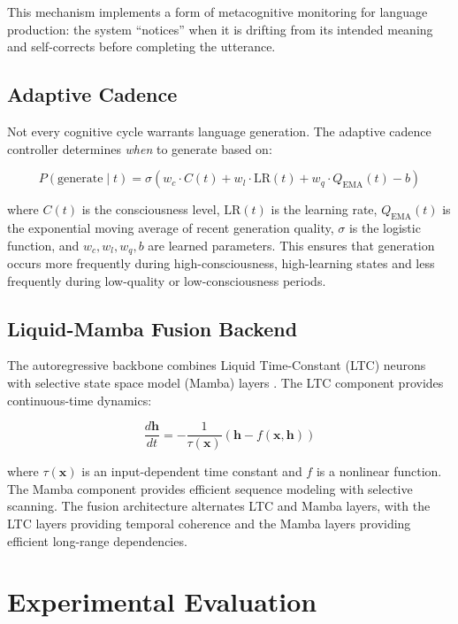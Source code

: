 \documentclass[12pt,a4paper]{article}
\begin{document}
This mechanism implements a form of metacognitive monitoring for language production: the system ``notices'' when it is drifting from its intended meaning and self-corrects before completing the utterance.

\subsection{Adaptive Cadence}

Not every cognitive cycle warrants language generation. The adaptive cadence controller determines \emph{when} to generate based on:

\begin{equation}
P(\text{generate} \mid t) = \sigma\left( w_c \cdot C(t) + w_l \cdot \text{LR}(t) + w_q \cdot Q_{\text{EMA}}(t) - b \right)
\end{equation}

where $C(t)$ is the consciousness level, $\text{LR}(t)$ is the learning rate, $Q_{\text{EMA}}(t)$ is the exponential moving average of recent generation quality, $\sigma$ is the logistic function, and $w_c, w_l, w_q, b$ are learned parameters. This ensures that generation occurs more frequently during high-consciousness, high-learning states and less frequently during low-quality or low-consciousness periods.

\subsection{Liquid-Mamba Fusion Backend}

The autoregressive backbone combines Liquid Time-Constant (LTC) neurons \citep{hasani2021liquid} with selective state space model (Mamba) layers \citep{gu2024mamba}. The LTC component provides continuous-time dynamics:

\begin{equation}
\frac{d\mathbf{h}}{dt} = -\frac{1}{\tau(\mathbf{x})} \left(\mathbf{h} - f(\mathbf{x}, \mathbf{h})\right)
\end{equation}

where $\tau(\mathbf{x})$ is an input-dependent time constant and $f$ is a nonlinear function. The Mamba component provides efficient sequence modeling with selective scanning. The fusion architecture alternates LTC and Mamba layers, with the LTC layers providing temporal coherence and the Mamba layers providing efficient long-range dependencies.

\section{Experimental Evaluation}
\end{document}
